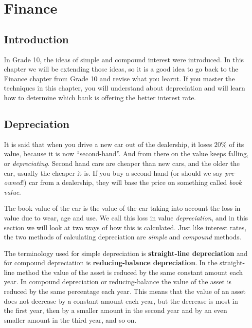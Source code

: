 \chapter{Finance}
\label{m:f11}

\section{Introduction}
In Grade 10, the ideas of simple and compound interest were introduced. In this chapter we will be extending those ideas, so it is a good idea to go back to the Finance chapter from Grade 10 and revise what you learnt. If you master the techniques in this chapter, you will understand about depreciation and will learn how to determine which bank is offering the better interest rate.

\section{Depreciation}

It is said that when you drive a new car out of the dealership, it loses $20\%$ of its value, because it is now ``second-hand''. And from there on the value keeps falling, or \textit{depreciating}. Second hand cars are cheaper than new cars, and the older the car, usually the cheaper it is. If you buy a second-hand (or should we say \textit{pre-owned}!) car from a dealership, they will base the price on something called \textit{book value}.

The book value of the car is the value of the car taking into account the loss in value due to wear, age and use. We call this loss in value \textit{depreciation}, and in this section we will look at two ways of how this is calculated. Just like interest rates, the two methods of calculating depreciation are \textit{simple} and \textit{compound} methods.

The terminology used for simple depreciation is \textbf{straight-line depreciation} and for compound depreciation is \textbf{reducing-balance depreciation}.  In the straight-line method the value of the asset is reduced by the same constant amount each year. In compound depreciation or reducing-balance the value of the asset is reduced by the same percentage each year. This means that the value of an asset does not decrease by a constant amount each year, but the decrease is most in the first year, then by a smaller amount in the second year and by an even smaller amount in the third year, and so on.


